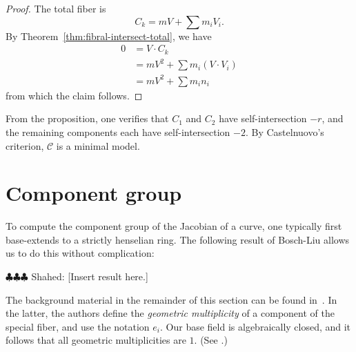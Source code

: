 \documentclass{article}
\newcommand{\shahed}[1]{{\color{Purple} \sf $\clubsuit\clubsuit\clubsuit$ Shahed: [#1]}}
\newcommand{\scd}{\mathscr{C}}
\theoremstyle{plain}
\theoremstyle{definition}
\theoremstyle{remark}
\begin{document}
\begin{proof}
  The total fiber is
  \[
  C_k = mV + \sum m_i V_i.
  \]
  By Theorem~\ref{thm:fibral-intersect-total}, we have
  \begin{align*}
    0 &= V \cdot C_k \\
    &= mV^2 + \sum m_i (V \cdot V_i) \\
    &= mV^2 + \sum m_i n_i
  \end{align*}
  from which the claim follows.
\end{proof}

From the proposition, one verifies that $C_1$ and $C_2$ have self-intersection $-r$, and the remaining components each have self-intersection $-2$. By Castelnuovo's criterion, $\scd$ is a minimal model. 




\section{Component group}
\label{sec:component-group}

To compute the component group of the Jacobian of a curve, one typically first base-extends to a strictly henselian ring. The following result of Bosch-Liu allows us to do this without complication:

\shahed{Insert result here.}

The background material in the remainder of this section can be found in~\cite[Ch. 9]{blr}. In the latter, the authors define the \emph{geometric multiplicity} of a component of the special fiber, and use the notation $e_i$. Our base field is algebraically closed, and it follows that all geometric multiplicities are $1$. (See \cite[Defn~9.1.3]{blr}.)
\end{document}
